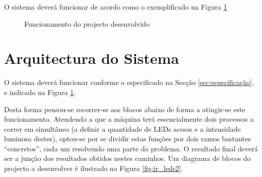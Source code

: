 \documentclass[a4paper,11pt,openright,oneside]{report}
\begin{document}
O sistema deverá funcionar de acordo como o exemplificado na Figura \ref{fig:ir_leds1}

\begin{figure}[ht]
\center
{}
\caption{Funcionamento do projecto desenvolvido}
\label{fig:ir_leds1}
\end{figure}

\section{Arquitectura do Sistema}

O sistema deverá funcionar conforme o especificado na Secção \ref{sec:especificação}, e indicado na Figura \ref{fig:ir_leds1}.

Desta forma pensou-se recorrer-se aos blocos abaixo de forma a atingir-se este funcionamento. Atendendo a que a máquina terá essencialmente dois processos a correr em simultâneo (a definir a quantidade de LEDs acesos e a intensidade luminosa destes), optou-se por se dividir estas funções por dois ramos bastantes ``concretos'', cada um resolvendo uma parte do problema. O resultado final deverá ser a junção  dos resultados obtidos nestes caminhos. Um diagrama de blocos do projecto a desenvolver é ilustrado na Figura \ref{fig:ir_leds2}.
\end{document}
